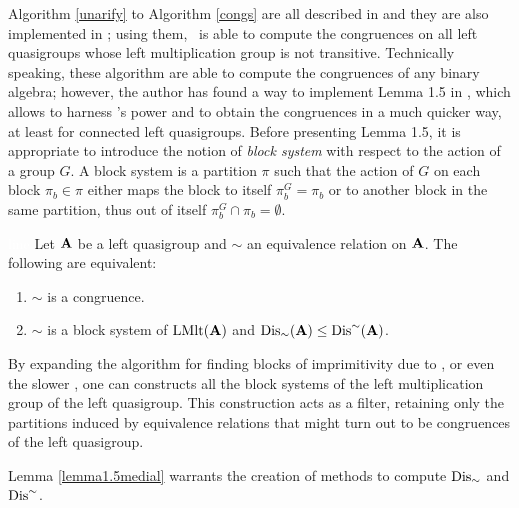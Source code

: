 \documentclass{mcom-l}
\begin{document}
\noindent Algorithm \ref{unarify} to Algorithm \ref{congs} are all described in \cite{Araujo2022CREAMAP} and they are also implemented in \Software; using them, \Software~is able to compute the congruences on all left quasigroups whose left multiplication group is not transitive. \newline
Technically speaking, these algorithm are able to compute the congruences of any binary algebra; however, the author has found a way to implement Lemma 1.5 in \cite{bonatto2022medial}, which allows to harness \magma's power and to obtain the congruences in a much quicker way, at least for connected left quasigroups.\newline
Before presenting Lemma 1.5, it is appropriate to introduce the notion of \emph{block system} with respect to the action of a group $G$. A block system is a partition $\pi$ such that the action of $G$ on each block $\pi_b\in \pi$ either maps the block to itself $\pi_b^G = \pi_b$ or to another block in the same partition, thus out of itself $\pi_b^G \cap \pi_b = \emptyset$.

\begin{lemma}\textcolor{white}{line}\newline\label{lemma1.5medial}
Let $\mathbf{A}$ be a left quasigroup and $\sim$ an equivalence relation on $\mathbf{A}$. The following are equivalent:
\begin{enumerate}
    \item $\sim$ is a congruence.
    \item $\sim$ is a block system of $\operatorname{LMlt}(\mathbf{A})$ and  $\operatorname{Dis}_{\sim}(\mathbf{A})\leq \operatorname{Dis}^{\sim}(\mathbf{A})$.
\end{enumerate}
\end{lemma}

\noindent By expanding the algorithm for finding blocks of imprimitivity due to \cite{schonert1994finding, seress_2003}, or even the slower \cite{atkinson}, one can constructs all the block systems of the left multiplication group of the left quasigroup. This construction acts as a filter, retaining only the partitions induced by equivalence relations that might turn out to be congruences of the left quasigroup. 

\noindent Lemma \ref{lemma1.5medial} warrants the creation of methods to compute $\operatorname{Dis}_\sim$ and $\operatorname{Dis}^\sim$.
\end{document}

